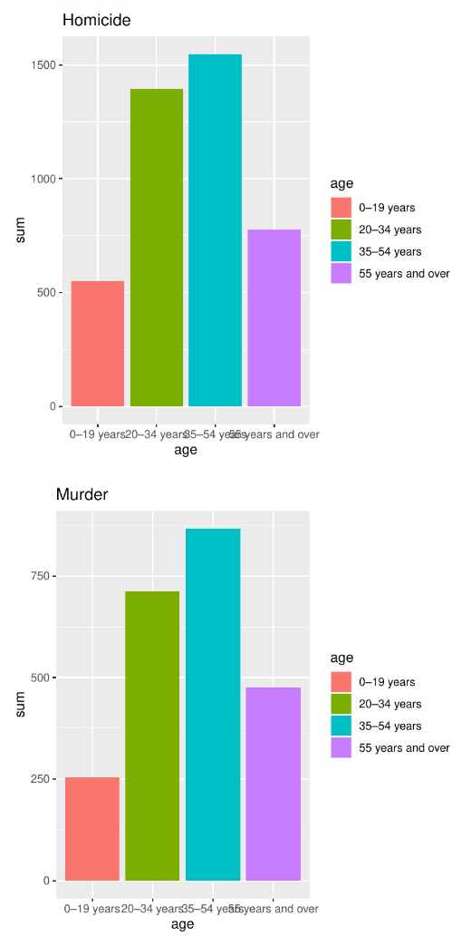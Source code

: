 \documentclass[11pt,a4paper,]{article}
\begin{document}
\includegraphics{report_files/figure-latex/Homplot-1.pdf}

\includegraphics{report_files/figure-latex/murplot-1.pdf}
\end{document}
